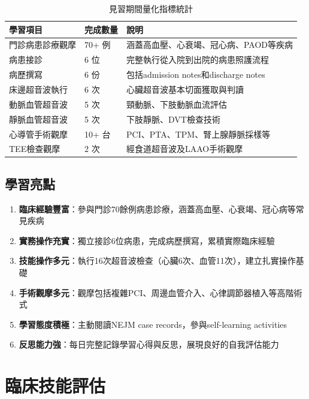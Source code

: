 \documentclass[12pt,a4paper]{article}
\begin{document}
\begin{table}[h]
\centering
\caption{見習期間量化指標統計}
\begin{tabular}{|p{4cm}|p{2cm}|p{6cm}|}
\hline
\textbf{學習項目} & \textbf{完成數量} & \textbf{說明} \\
\hline
門診病患診療觀摩 & 70+ 例 & 涵蓋高血壓、心衰竭、冠心病、PAOD等疾病 \\
\hline
病患接診 & 6 位 & 完整執行從入院到出院的病患照護流程 \\
\hline
病歷撰寫 & 6 份 & 包括admission notes和discharge notes \\
\hline
床邊超音波執行 & 6 次 & 心臟超音波基本切面獲取與判讀 \\
\hline
動脈血管超音波 & 5 次 & 頸動脈、下肢動脈血流評估 \\
\hline
靜脈血管超音波 & 5 次 & 下肢靜脈、DVT檢查技術 \\
\hline
心導管手術觀摩 & 10+ 台 & PCI、PTA、TPM、腎上腺靜脈採樣等 \\
\hline
TEE檢查觀摩 & 2 次 & 經食道超音波及LAAO手術觀摩 \\
\hline
\end{tabular}
\end{table}

\subsection{學習亮點}

\begin{enumerate}
\item \textbf{臨床經驗豐富}：參與門診70餘例病患診療，涵蓋高血壓、心衰竭、冠心病等常見疾病
\item \textbf{實務操作充實}：獨立接診6位病患，完成病歷撰寫，累積實際臨床經驗
\item \textbf{技能操作多元}：執行16次超音波檢查（心臟6次、血管11次），建立扎實操作基礎
\item \textbf{手術觀摩多元}：觀摩包括複雜PCI、周邊血管介入、心律調節器植入等高階術式
\item \textbf{學習態度積極}：主動閱讀NEJM case records，參與self-learning activities
\item \textbf{反思能力強}：每日完整記錄學習心得與反思，展現良好的自我評估能力
\end{enumerate}

\section{臨床技能評估}
\end{document}

